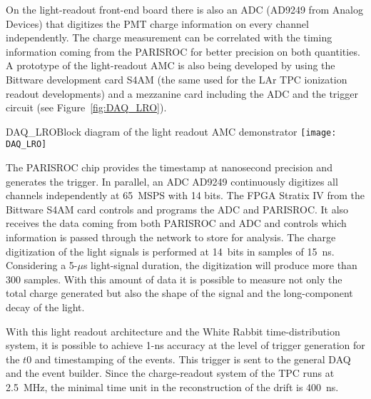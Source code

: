 On the light-readout front-end board there is also an ADC (AD9249 from
Analog Devices) that digitizes the PMT charge information on every
channel independently. The charge measurement can be correlated with
the timing information coming from the PARISROC for better precision
on both quantities. A prototype of the light-readout AMC is also being
developed by using the Bittware development card S4AM (the same used
for the LAr TPC ionization readout developments) and a mezzanine card
including the ADC and the trigger circuit (see
Figure~\ref{fig:DAQ_LRO}).
\begin{cdrfigure}{DAQ_LRO}{Block diagram of the light readout AMC demonstrator}
 \texttt{[image: DAQ\_LRO]}  
\end{cdrfigure}

The PARISROC chip provides the timestamp at nanosecond precision and
generates the trigger. In parallel, an ADC AD9249 continuously
digitizes all channels independently at 65~MSPS with 14 bits. The FPGA
Stratix IV from the Bittware S4AM card controls and programs the ADC
and PARISROC. It also receives the data coming from both PARISROC and
ADC and controls which information is passed through the network to
store for analysis.  The charge digitization of the light signals is
performed at 14~bits in samples of 15~ns. Considering a 5-$\mu$s
light-signal duration, the digitization will produce more than 300
samples. With this amount of data it is possible to measure not only
the total charge generated but also the shape of the signal and the
long-component decay of the light.


With this light readout architecture and the White Rabbit
time-distribution system, it is possible to achieve 1-ns accuracy at
the level of trigger generation for the $t0$ and timestamping of the
events. This trigger is sent to the general DAQ and the event
builder. Since the charge-readout system of the TPC runs at 2.5~MHz,
the minimal time unit in the reconstruction of the drift is 400~ns.
